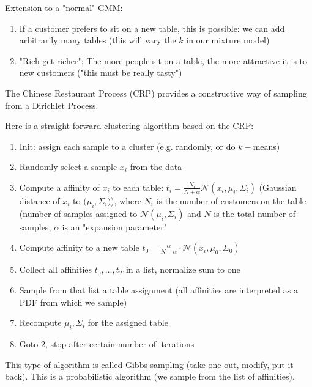 \documentclass{scrartcl}
\begin{document}
Extension to a "normal" GMM:
\begin{enumerate}
    \item
        If a customer prefers to sit on a new table, this is possible: we can add arbitrarily many tables (this will vary the \(k\) in our mixture model)
    \item
        "Rich get richer":
        The more people sit on a table, the more attractive it is to new customers ("this must be really tasty")
\end{enumerate}

The Chinese Restaurant Process (CRP) provides a constructive way of sampling from a Dirichlet Process.

Here is a straight forward clustering algorithm based on the CRP:

\begin{enumerate}
    \item
        Init: assign each sample to a cluster (e.g. randomly, or do \(k-\)means)
    \item
        Randomly select a sample \(x_i\) from the data
    \item
        Compute a affinity of \(x_i\) to each table: \(t_i = \frac{N_i}{N+\alpha} \mathcal{N}(x_i, \mu_i, \Sigma_i)\) (Gaussian distance of \(x_i\) to \(\mathcal(\mu_i, \Sigma_i)\)), where \(N_i\) is the number of customers on the table (number of samples assigned to \(\mathcal{N}(\mu_i, \Sigma_i)\) and \(N\) is the total number of samples, \(\alpha\) is an "expansion parameter"
    \item
        Compute affinity to a new table \(t_0 = \frac{\alpha}{N + \alpha} \cdot \mathcal{N}(x_i, \mu_0, \Sigma_0)\)
    \item
        Collect all affinities \(t_0, \dots, t_T\) in a list, normalize sum to one
    \item
        Sample from that list a table assignment (all affinities are interpreted as a PDF from which we sample)
    \item
        Recompute \(\mu_i, \Sigma_i\) for the assigned table
    \item
        Goto 2, stop after certain number of iterations
\end{enumerate}

This type of algorithm is called Gibbs sampling (take one out, modify, put it back). This is a probabilistic algorithm (we sample from the list of affinities).
\end{document}
